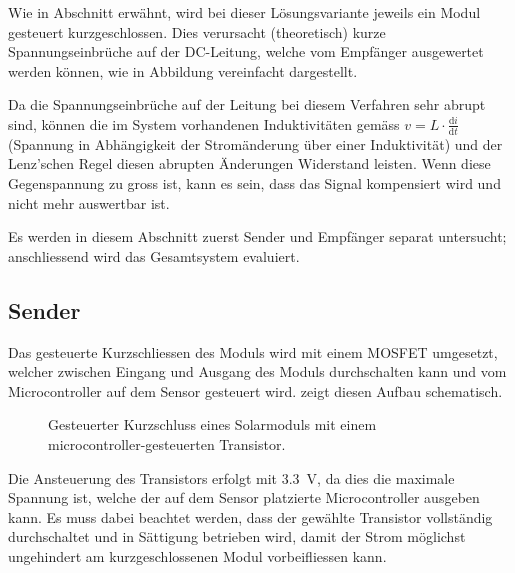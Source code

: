Wie in Abschnitt  erw\"ahnt, wird bei dieser L\"osungsvariante
jeweils  ein Modul  gesteuert  kurzgeschlossen. Dies verursacht  (theoretisch)
kurze  Spannungseinbr\"uche   auf  der  DC-Leitung,  welche   vom  Empf\"anger
ausgewertet  werden  k\"onnen,  wie in  Abbildung  vereinfacht
dargestellt.

Da die Spannungseinbr\"uche  auf der Leitung bei diesem  Verfahren sehr abrupt
sind,  k\"onnen  die im  System  vorhandenen  Induktivit\"aten gem\"ass  $v  =
L  \cdot  \frac{\mathrm{d}i}{\mathrm{d}t}$  (Spannung  in  Abh\"angigkeit  der
Strom\"anderung \"uber  einer Induktivit\"at) und der  Lenz'schen Regel diesen
abrupten \"Anderungen  Widerstand leisten. Wenn  diese Gegenspannung  zu gross
ist, kann es sein, dass das  Signal kompensiert wird und nicht mehr auswertbar
ist.

Es  werden  in   diesem  Abschnitt  zuerst  Sender   und  Empf\"anger  separat
untersucht; anschliessend wird das Gesamtsystem evaluiert.


\subsection{Sender}
\label{subsec:simu:ask:sensor}

Das  gesteuerte Kurzschliessen  des Moduls  wird mit  einem MOSFET  umgesetzt,
welcher zwischen  Eingang und  Ausgang des Moduls  durchschalten kann  und vom
Microcontroller auf dem Sensor gesteuert wird. 
zeigt diesen Aufbau schematisch.

\begin{figure}
    \vspace*{-1em}
    \centering
    
    \caption[Grundprinzip Kurzschluss mit Transistor]{%
        Gesteuerter     Kurzschluss     eines    Solarmoduls     mit     einem
        microcontroller-gesteuerten Transistor. %
    }
    \label{fig:module:mosfet:simple}
    \vspace*{-1em}
\end{figure}

Die  Ansteuerung des  Transistors  erfolgt mit  \SI{3.3}{\volt},  da dies  die
maximale Spannung  ist, welche der  auf dem Sensor  platzierte Microcontroller
ausgeben kann. Es muss  dabei beachtet werden, dass  der gew\"ahlte Transistor
vollst\"andig durchschaltet und in S\"attigung betrieben wird, damit der Strom
m\"oglichst ungehindert am kurzgeschlossenen Modul vorbeifliessen kann.

